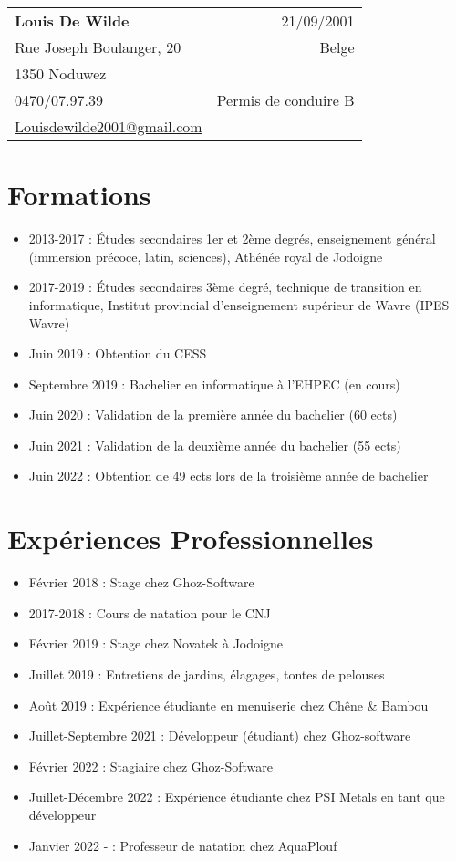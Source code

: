 \documentclass[a4paper,12pt]{article}
\begin{document}
    \noindent
    \begin{tabular*}{\textwidth}{@{\extracolsep{\fill}}lr}
        \textbf{Louis De Wilde} & 21/09/2001\\
        Rue Joseph Boulanger, 20 & Belge\\
        1350 Noduwez & \\
        0470/07.97.39 & Permis de conduire B\\
        \href{mailto:Louisdewilde2001@gmail.com}{Louisdewilde2001@gmail.com} & \\
    \end{tabular*}

    \section*{Formations}
    \begin{itemize}[noitemsep]
        \item 2013-2017 : Études secondaires 1er et 2ème degrés, enseignement général (immersion précoce, latin, sciences), Athénée royal de Jodoigne
        \item 2017-2019 : Études secondaires 3ème degré, technique de transition en informatique, Institut provincial d’enseignement supérieur de Wavre (IPES Wavre)
        \item Juin 2019 : Obtention du CESS
        \item Septembre 2019 : Bachelier en informatique à l'EHPEC (en cours)
        \item Juin 2020 : Validation de la première année du bachelier (60 ects)
        \item Juin 2021 : Validation de la deuxième année du bachelier (55 ects)
        \item Juin 2022 : Obtention de 49 ects lors de la troisième année de bachelier
    \end{itemize}

    \section*{Expériences Professionnelles}
    \begin{itemize}[noitemsep]
        \item Février 2018 : Stage chez Ghoz-Software
        \item 2017-2018 : Cours de natation pour le CNJ
        \item Février 2019 : Stage chez Novatek à Jodoigne
        \item Juillet 2019 : Entretiens de jardins, élagages, tontes de pelouses
        \item Août 2019 : Expérience étudiante en menuiserie chez Chêne \& Bambou
        \item Juillet-Septembre 2021 : Développeur (étudiant) chez Ghoz-software
        \item Février 2022 : Stagiaire chez Ghoz-Software
        \item Juillet-Décembre 2022 : Expérience étudiante chez PSI Metals en tant que développeur
        \item Janvier 2022 - : Professeur de natation chez AquaPlouf
    \end{itemize}
\end{document}
